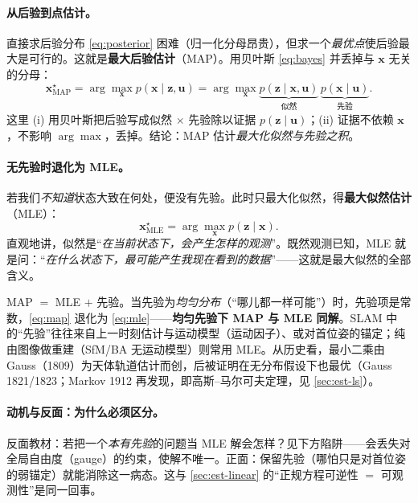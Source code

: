 \paragraph{从后验到点估计。}
直接求后验分布 \cref{eq:posterior} 困难（归一化分母昂贵），但求一个\emph{最优点}使后验最大是可行的。这就是\textbf{最大后验估计}（MAP）。用贝叶斯 \cref{eq:bayes} 并丢掉与 $\mathbf{x}$ 无关的分母\cite{gaoxiang2019slam14,carlone2026handbook}：
\begin{equation}
  \mathbf{x}^\star_{\mathrm{MAP}}
  =\arg\max_{\mathbf{x}} p(\mathbf{x}\mid\mathbf{z},\mathbf{u})
  =\arg\max_{\mathbf{x}} \underbrace{p(\mathbf{z}\mid\mathbf{x},\mathbf{u})}_{\text{似然}}\,\underbrace{p(\mathbf{x}\mid\mathbf{u})}_{\text{先验}}.
  \label{eq:map}
\end{equation}
这里 (i) 用贝叶斯把后验写成似然 $\times$ 先验除以证据 $p(\mathbf{z}\mid\mathbf{u})$；(ii) 证据不依赖 $\mathbf{x}$，不影响 $\arg\max$，丢掉。结论：MAP 估计\emph{最大化似然与先验之积}。

\paragraph{无先验时退化为 MLE。}
若我们\emph{不知道}状态大致在何处，便没有先验。此时只最大化似然，得\textbf{最大似然估计}（MLE）：
\begin{equation}
  \mathbf{x}^\star_{\mathrm{MLE}}=\arg\max_{\mathbf{x}} p(\mathbf{z}\mid\mathbf{x}).
  \label{eq:mle}
\end{equation}
直观地讲，似然是“\emph{在当前状态下，会产生怎样的观测}”。既然观测已知，MLE 就是问：“\emph{在什么状态下，最可能产生我现在看到的数据}”——这就是最大似然的全部含义\cite{gaoxiang2019slam14}。

\begin{insight}
MAP $=$ MLE $+$ 先验。当先验为\emph{均匀分布}（“哪儿都一样可能”）时，先验项是常数，\cref{eq:map} 退化为 \cref{eq:mle}——\textbf{均匀先验下 MAP 与 MLE 同解}。SLAM 中的“先验”往往来自上一时刻估计与运动模型（运动因子）、或对首位姿的锚定；纯由图像做重建（SfM/BA 无运动模型）则常用 MLE。从历史看，最小二乘由 Gauss（1809）为天体轨道估计而创，后被证明在无分布假设下也最优（Gauss 1821/1823；Markov 1912 再发现，即高斯–马尔可夫定理，见 \cref{sec:est-ls}）。
\end{insight}

\paragraph{动机与反面：为什么必须区分。}
反面教材：若把一个\emph{本有先验}的问题当 MLE 解会怎样？见下方陷阱——会丢失对全局自由度（gauge）的约束，使解不唯一。正面：保留先验（哪怕只是对首位姿的弱锚定）就能消除这一病态。这与 \cref{sec:est-linear} 的“正规方程可逆性 $=$ 可观测性”是同一回事。

